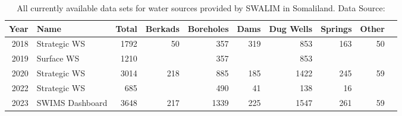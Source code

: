 \begin{table}[!h]
    \caption[Water Sources]{All currently available data sets for water sources provided by SWALIM in Somaliland. Data Source: \textcite{swalimSomaliaWaterSources,swalmSomaliaWaterSources2023}}
    \begin{adjustbox}{center,max width=\linewidth}
        \def\arraystretch{1.5}
        \begin{tabular}{rlrrrrrrrr}
            \toprule
            \bf Year & \bf Name    & \bf Total & \bf Berkads & \bf Boreholes & \bf Dams & \bf Dug Wells & \bf Springs & Other \\
            \midrule
            2018 & Strategic WS    & 1792      & 50           & 357          & 319      & 853           & 163         & 50    \\
            2019 & Surface WS      & 1210      & ~            & 357          & ~        & 853           & ~           & ~     \\
            2020 & Strategic WS    & 3014      & 218          & 885          & 185      & 1422          & 245         & 59    \\
            2022 & Strategic WS    & 685       & ~            & 490          & 41       & 138           & 16          & ~     \\
            2023 & SWIMS Dashboard & 3648      & 217          & 1339         & 225      & 1547          & 261         & 59    \\
            \bottomrule
        \end{tabular}
    \end{adjustbox}
    \label{tab:res_data}
\end{table}

